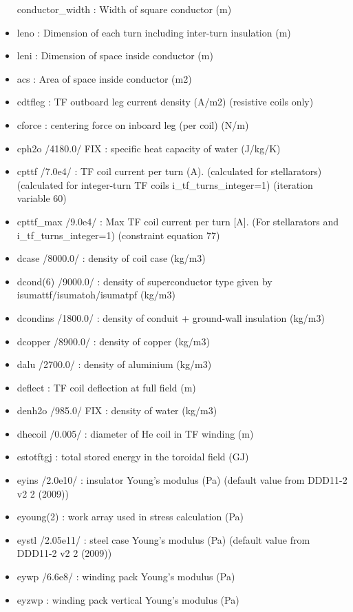 \documentclass[]{article}
\begin{document}
\begin{itemize}
  conductor\_width : Width of square conductor (m)
\item
  leno : Dimension of each turn including inter-turn insulation (m)
\item
  leni : Dimension of space inside conductor (m)
\item
  acs : Area of space inside conductor (m2)
\item
  cdtfleg : TF outboard leg current density (A/m2) (resistive coils
  only)
\item
  cforce : centering force on inboard leg (per coil) (N/m)
\item
  cph2o /4180.0/ FIX : specific heat capacity of water (J/kg/K)
\item
  cpttf /7.0e4/ : TF coil current per turn (A). (calculated for
  stellarators) (calculated for integer-turn TF coils
  i\_tf\_turns\_integer=1) (iteration variable 60)
\item
  cpttf\_max /9.0e4/ : Max TF coil current per turn {[}A{]}. (For
  stellarators and i\_tf\_turns\_integer=1) (constraint equation 77)
\item
  dcase /8000.0/ : density of coil case (kg/m3)
\item
  dcond(6) /9000.0/ : density of superconductor type given by
  isumattf/isumatoh/isumatpf (kg/m3)
\item
  dcondins /1800.0/ : density of conduit + ground-wall insulation
  (kg/m3)
\item
  dcopper /8900.0/ : density of copper (kg/m3)
\item
  dalu /2700.0/ : density of aluminium (kg/m3)
\item
  deflect : TF coil deflection at full field (m)
\item
  denh2o /985.0/ FIX : density of water (kg/m3)
\item
  dhecoil /0.005/ : diameter of He coil in TF winding (m)
\item
  estotftgj : total stored energy in the toroidal field (GJ)
\item
  eyins /2.0e10/ : insulator Young's modulus (Pa) (default value from
  DDD11-2 v2 2 (2009))
\item
  eyoung(2) : work array used in stress calculation (Pa)
\item
  eystl /2.05e11/ : steel case Young's modulus (Pa) (default value from
  DDD11-2 v2 2 (2009))
\item
  eywp /6.6e8/ : winding pack Young's modulus (Pa)
\item
  eyzwp : winding pack vertical Young's modulus (Pa)

\end{itemize}
\end{document}
